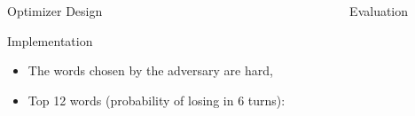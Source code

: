 \documentclass[final]{beamer}
\begin{document}
{\begin{frame}{}
\begin{center}
\begin{columns}[t]
\begin{column}{0.32\textwidth}
\begin{block}{\huge Optimizer Design}
\begin{center}
\begin{figure}
\end{figure}
\end{center}


\end{block}

\vspace{1.5cm}

    \begin{block}{\huge Implementation}

\vspace{.5cm}
\begin{itemize}
\item The words chosen by the adversary are hard,
\item Top 12 words {\color{orange}(probability of losing in 6 turns)}:
\end{itemize}

    \end{block}


\end{column}

\begin{column}{0.32\textwidth}

       \begin{block}{\huge Evaluation}


\end{block}
\end{column}
\end{columns}
\end{center}
\end{frame}}
\end{document}
